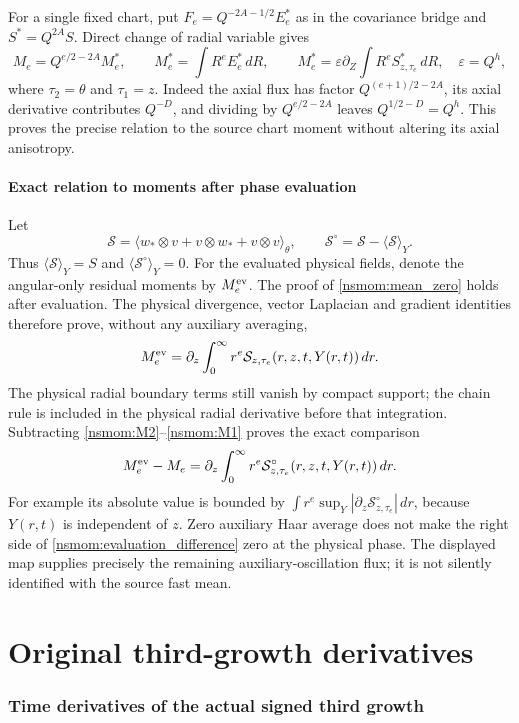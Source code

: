 \documentclass[11pt]{article}
\begin{document}
For a single fixed chart, put
$F_e=Q^{-2A-1/2}E_e^*$ as in the covariance bridge and
$S^*=Q^{2A}S$. Direct change of radial variable gives
\[
 M_e=Q^{e/2-2A}M_e^*,\qquad
 M_e^*=\int R^eE_e^*\,dR,
 \qquad
 M_e^*=\varepsilon\partial_Z\int R^e S^*_{z,\tau_e}\,dR,
 \quad\varepsilon=Q^h,
\]
where $\tau_2=\theta$ and $\tau_1=z$. Indeed the axial flux has
factor $Q^{(e+1)/2-2A}$, its axial derivative contributes $Q^{-D}$,
and dividing by $Q^{e/2-2A}$ leaves $Q^{1/2-D}=Q^h$.
This proves the precise relation to the source chart moment without
altering its axial anisotropy.

\subsection{Exact relation to moments after phase evaluation}
\label{nsmom:evaluated}
Let
\[
 \mathcal S=\langle w_*\otimes v+v\otimes w_*+v\otimes v\rangle_\theta,
 \qquad \mathcal S^\circ=\mathcal S-\langle\mathcal S\rangle_Y.
\]
Thus $\langle\mathcal S\rangle_Y=S$ and
$\langle\mathcal S^\circ\rangle_Y=0$. For the evaluated physical
fields, denote the angular-only residual moments by $M_e^{\rm ev}$.
The proof of \eqref{nsmom:mean_zero} holds after evaluation. The
physical divergence, vector Laplacian and gradient identities therefore
prove, without any auxiliary averaging,
\[
 M_e^{\rm ev}
   =\partial_z\int_0^\infty r^e
        \mathcal S_{z,\tau_e}(r,z,t,Y(r,t))\,dr.
\]
The physical radial boundary terms still vanish by compact support;
the chain rule is included in the physical radial derivative before
that integration. Subtracting \eqref{nsmom:M2}--\eqref{nsmom:M1} proves
the exact comparison
\begin{equation}
 M_e^{\rm ev}-M_e
 =\partial_z\int_0^\infty r^e
     \mathcal S^\circ_{z,\tau_e}(r,z,t,Y(r,t))\,dr.
 \label{nsmom:evaluation_difference}
\end{equation}
For example its absolute value is bounded by
$\int r^e\sup_Y|\partial_z\mathcal S^\circ_{z,\tau_e}|\,dr$,
because $Y(r,t)$ is independent of $z$. Zero auxiliary Haar average
does not make the right side of \eqref{nsmom:evaluation_difference}
zero at the physical phase. The displayed map supplies precisely the
remaining auxiliary-oscillation flux; it is not silently identified
with the source fast mean.

\clearpage\part{Original third-growth derivatives}
\section{Time derivatives of the actual signed third growth}
\label{tgdc:section}
\end{document}
